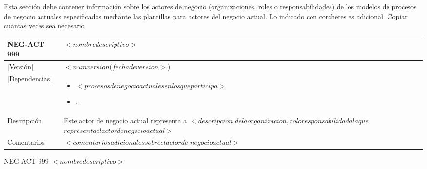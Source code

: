 \begin{textoazul}
Esta sección debe contener información sobre los actores de negocio (organizaciones, roles o responsabilidades) de los modelos de procesos de negocio actuales especificados mediante las plantillas para actores del negocio actual. Lo indicado con corchetes es adicional. Copiar cuantas veces sea necesario

 \end{textoazul}

 \begin{Artefacto}[H]
    \centering
    \begin{tabular}{|p{3cm}|p{10cm}|}
        \hline
         \cellcolor{gray30}  NEG-ACT 999	&  $<nombre descriptivo>$\\ 
        \hline
         \cellcolor{gray30}  [Versión]	&  $<num version(fecha de version>$)\\   
         \hline
         \cellcolor{gray30}  [Dependencias] &  	\begin{itemize} \item $<procesos de negocio actuales en los que participa>$
\item	... \end{itemize}\\  
        \hline
         \cellcolor{gray30} Descripción	& Este actor de negocio actual representa a $<descripcion$ $de la organizacion, rol  o responsabilidad  a la que$ $representa  el actor de negocio actual>$  \\
        \hline
         \cellcolor{gray30}  Comentarios	&$<comentarios adicionales sobre el actor  de $ $negocio  actual>$\\   
        \hline
  
    \end{tabular}
\caption{NEG-ACT 999	$<nombre descriptivo>$ }
  \end{Artefacto}

